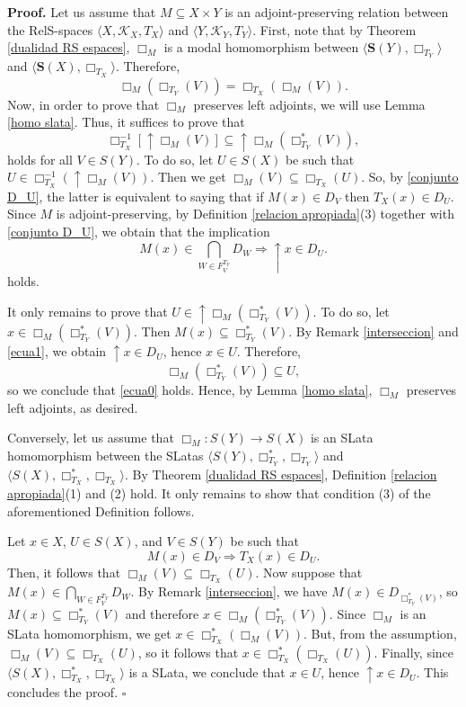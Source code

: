 \documentclass{article}
\newenvironment{proof}
{\par\noindent\textbf{Proof. }\rm}
{\hfill$\boldsymbol{\square}$\par\vspace{0.3cm}}
\begin{document}
\begin{proof}
Let us assume that $M \subseteq X \times Y$ is an adjoint-preserving relation between the RelS-spaces $\langle X, \mathcal{K}_X, T_X \rangle$ and $\langle Y, \mathcal{K}_Y, T_Y \rangle$. First, note that by Theorem \ref{dualidad RS espaces}, $\Box_M$ is a modal homomorphism between $\langle \mathbf{S}(Y), \Box_{T_Y}\rangle$ and $\langle \mathbf{S}(X), \Box_{T_X}\rangle$. Therefore,
\[
\Box_M(\Box_{T_Y}(V)) = \Box_{T_X}(\Box_M(V)).
\]
Now, in order to prove that $\Box_{M}$ preserves left adjoints, we will use Lemma \ref{homo slata}. Thus, it suffices to prove that
\begin{equation}\label{ecua0}
\Box_{T_X}^{-1}[\uparrow \Box_M(V)] \subseteq \uparrow \Box_M(\Box_{T_Y}^{*}(V)),
\end{equation}
holds for all $V\in S(Y)$. To do so, let $U \in S(X)$ be such that $U \in \Box_{T_X}^{-1}(\uparrow \Box_M(V))$.
Then we get $\Box_M(V) \subseteq \Box_{T_X}(U)$. So, by \eqref{conjunto D_U}, the latter is equivalent to saying that if $M(x) \in D_V$ then $T_X(x) \in D_U$. Since $M$ is adjoint-preserving, by Definition \ref{relacion apropiada}(3) together with \eqref{conjunto D_U}, we obtain that the implication 
\begin{equation}\label{ecua1}
M(x) \in \bigcap_{W \in F^{T_Y}_V} D_W \Rightarrow \uparrow x \in D_U.    
\end{equation}
holds.

It only remains to prove that $U \in \uparrow \Box_M(\Box_{T_Y}^{*}(V))$. To do so, let $ x \in \Box_M(\Box_{T_Y}^{*}(V))$. Then $M(x) \subseteq \Box_{T_Y}^{*}(V)$. By Remark \ref{interseccion} and \eqref{ecua1}, we obtain $\uparrow x \in D_U$, hence $x \in U$. Therefore,
\[
\Box_M(\Box_{T_Y}^{*}(V)) \subseteq U,
\]
so we conclude that \eqref{ecua0} holds. Hence, by Lemma \ref{homo slata}, $\Box_M$ preserves left adjoints, as desired.
\medskip

Conversely, let us assume that $\Box_M : S(Y) \to S(X)$ is an SLata homomorphism between the SLatas $
\langle S(Y), \Box_{T_Y}^{*}, \Box_{T_Y} \rangle$
and $\langle S(X), \Box_{T_X}^{*}, \Box_{T_X} \rangle$. By Theorem \ref{dualidad RS espaces}, Definition \ref{relacion apropiada}(1) and (2) hold. It only remains to show that condition (3) of the aforementioned Definition follows.

Let $x \in X$, $U \in S(X)$, and $V \in S(Y)$ be such that
\[
M(x) \in D_V \Rightarrow T_X(x) \in D_U.
\]
Then, it follows that $\Box_M(V) \subseteq \Box_{T_X}(U)$. Now suppose that $ M(x) \in \bigcap_{W \in F^{T_Y}_V} D_W$.
By Remark \ref{interseccion}, we have $M(x) \in D_{\Box_{T_Y}^{*}(V)}$, so
$M(x) \subseteq \Box_{T_Y}^{*}(V)$ and therefore $x \in \Box_M(\Box_{T_Y}^{*}(V))$. Since $\Box_M$ is an SLata homomorphism, we get $x \in \Box_{T_X}^{*}(\Box_M(V))$. But, from the assumption, $\Box_M(V) \subseteq \Box_{T_X}(U)$, so it follows that $x \in \Box_{T_X}^{*}(\Box_{T_X}(U))$. Finally, since $\langle S(X), \Box_{T_X}^{*}, \Box_{T_X} \rangle$ is a SLata, we conclude that $x \in U$, hence $\uparrow x \in D_U$. This concludes the proof.
\end{proof}
\end{document}
